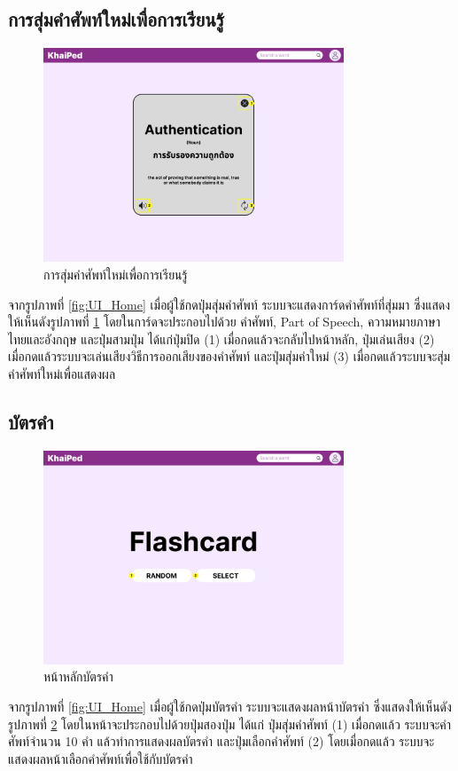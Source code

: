 \documentclass[12pt,oneside,openright,a4paper]{cpe-thai-project}
\begin{document}
\pagebreak
\subsection{การสุ่มคำศัพท์ใหม่เพื่อการเรียนรู้}
\begin{figure}[!h]\centering
	\includegraphics[width=0.8\textwidth, keepaspectratio=true]{image/chap3/ui/Random Word.png}
	\caption{การสุ่มคำศัพท์ใหม่เพื่อการเรียนรู้}\label{fig:UI_RandomWord}
\end{figure}
\hspace{1cm}
จากรูปภาพที่ \ref{fig:UI_Home} เมื่อผู้ใช้กดปุ่มสุ่มคำศัพท์ ระบบจะแสดงการ์ดคำศัพท์ที่สุ่มมา ซึ่งแสดงให้เห็นดังรูปภาพที่ \ref{fig:UI_RandomWord} 
โดยในการ์ดจะประกอบไปด้วย คำศัพท์, Part of Speech, ความหมายภาษาไทยและอังกฤษ และปุ่มสามปุ่ม ได้แก่ปุ่มปิด (1)
เมื่อกดแล้วจะกลับไปหน้าหลัก, ปุ่มเล่นเสียง (2) เมื่อกดแล้วระบบจะเล่นเสียงวิธีการออกเสียงของคำศัพท์ และปุ่มสุ่มคำใหม่ (3) เมื่อกดแล้วระบบจะสุ่มคำศัพท์ใหม่เพื่อแสดงผล

\pagebreak
\subsection{บัตรคำ}
\begin{figure}[!h]\centering
	\includegraphics[width=0.8\textwidth, keepaspectratio=true]{image/chap3/ui/flashcard/Flashcard.png}
	\caption{หน้าหลักบัตรคำ}\label{fig:UI_Flashcard}
\end{figure}
\hspace{1cm}
จากรูปภาพที่ \ref{fig:UI_Home} เมื่อผู้ใช้กดปุ่มบัตรคำ ระบบจะแสดงผลหน้าบัตรคำ ซึ่งแสดงให้เห็นดังรูปภาพที่ \ref{fig:UI_Flashcard} 
โดยในหน้าจะประกอบไปด้วยปุ่มสองปุ่ม ได้แก่ ปุ่มสุ่มคำศัพท์ (1) เมื่อกดแล้ว ระบบจะคำศัพท์จำนวน 10 คำ
แล้วทำการแสดงผลบัตรคำ และปุ่มเลือกคำศัพท์ (2) โดยเมื่อกดแล้ว ระบบจะแสดงผลหน้าเลือกคำศัพท์เพื่อใช้กับบัตรคำ
\end{document}
